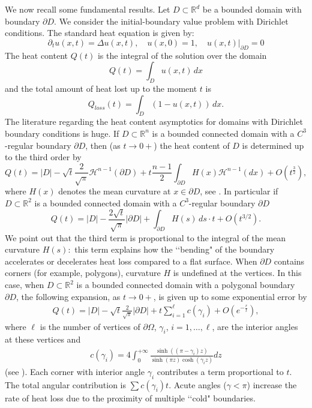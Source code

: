\documentclass[[11pt,a4paper,reqno]{article}
\newcommand{\R}{{\mathbb R}}
\numberwithin{equation}{section}
\begin{document}
We now recall some fundamental results.
  Let $D \subset \mathbb{R}^d$ be a bounded domain with boundary $\partial D$. We consider the initial-boundary value problem with Dirichlet conditions.
The standard heat equation is given by:
\begin{equation}
    \partial_t u(x,t) =\Delta u(x,t), \quad u(x,0)=1, \quad u(x,t)|_{\partial D}=0
\end{equation}
The heat content $Q(t)$ is the integral of the solution over the domain
\begin{equation}
    Q(t) = \int_{D} u(x, t) \, dx
\end{equation}
and the total amount of heat lost up to the moment $t$ is 
\begin{equation}
    Q_{loss}(t) = \int_{D} (1-u(x, t)) \, dx.
\end{equation}
The literature  regarding the heat content asymptotics for domains with Dirichlet boundary conditions  is huge.
If  $D\subset \R^n$ is a bounded connected domain with a $C^3$-regular boundary $\partial D$, then (as $t\to 0+$) the heat content of $D$ is determined up to the third order by 
$$
Q(t) = |D| - \sqrt{t}\frac{2}{\sqrt{\pi}} \mathcal{H}^{n-1}(\partial D)
+t\frac{n-1}{2}\int_{\partial D} H(x)\mathcal{H}^{n-1}(dx)+O(t^\frac{3}{2}),
$$
where $H(x)$ denotes the mean curvature at $x\in\partial D$, see \cite{Vdb94}.
In particular if $D\subset \R^2$  is a bounded connected domain with a $C^3$-regular boundary $\partial D$   \begin{equation}
    Q(t) = |D|  - \frac{2\sqrt{t}}{\sqrt{\pi}} |\partial D|  +  \int_{\partial D} H(s) \, ds \cdot t + O(t^{3/2}).
\end{equation}
We point out that the  third term is proportional to the integral of the mean curvature $H(s):$ 
this term explains how the \lq\lq bending" of the boundary accelerates or decelerates heat loss compared to a flat surface. When $\partial D$ contains corners (for example,  polygons), curvature $H$ is undefined at the vertices. In this case, 
when $D \subset \R^2$ is a bounded connected domain with a polygonal boundary $\partial D$, the following expansion, as $t\to 0+$, is given up to some exponential error by 
\begin{align*}
 Q(t) = |D|  -\sqrt{t}\frac{2}{\sqrt{\pi}}  |\partial D|  +t\sum_{i=1}^\ell c(\gamma_i)+O(e^{-\frac{r}{t}}),
\end{align*}
where $\ell$ is the number of vertices of $\partial\Omega$, $\gamma_i$, $i=1,\ldots, \ell$, are the interior angles at these vertices and 
\begin{align*}
    c(\gamma_i)=4\int_0^{+\infty} \frac{ \sinh ((\pi-\gamma_i)z)}{\sinh(\pi z)\cosh(\gamma_i z)}dz
\end{align*}
(see  \cite{Vdb90}). Each corner with interior angle $\gamma_i$ contributes a term proportional to $t$. The total angular contribution is $\sum c(\gamma_i)t$. Acute angles ($\gamma < \pi$) increase the rate of heat loss due to the proximity of multiple \lq\lq cold" boundaries.
\end{document}

